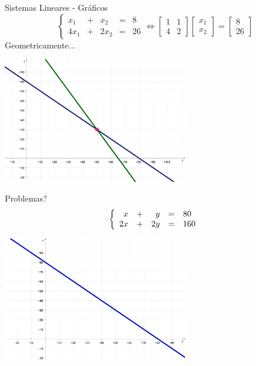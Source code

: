 \documentclass[hyperref={pdfpagelabels=false}]{beamer}
\begin{document}
\begin{frame}{Sistemas Lineares - Gráficos}
  \begin{equation*}
    \left\{ 
    \begin{matrix} 
      x_1&+&x_2&=&8\\
      4x_1&+&2x_2&=&26 
    \end{matrix} 
    \right. \Leftrightarrow 
    \begin{bmatrix} 
      1 & 1\\
      4 & 2 
    \end{bmatrix} 
    \begin{bmatrix}
      x_1\\
      x_2
    \end{bmatrix}
    =
    \begin{bmatrix}
      8\\
      26
    \end{bmatrix}
  \end{equation*}
  Geometricamente...
  \begin{center}
    \includegraphics[width=8cm]{img/sistema.png}
  \end{center}
\end{frame}

\begin{frame}{Problemas?}
	$$\left\{ \begin{array}{r c r c l} x&+&y&=&80\\2x&+&2y&=&160 \end{array} \right.$$
	\begin{center}
	  \includegraphics[width=8cm]{img/indeterminado.png}
	\end{center}
\end{frame}
\end{document}
